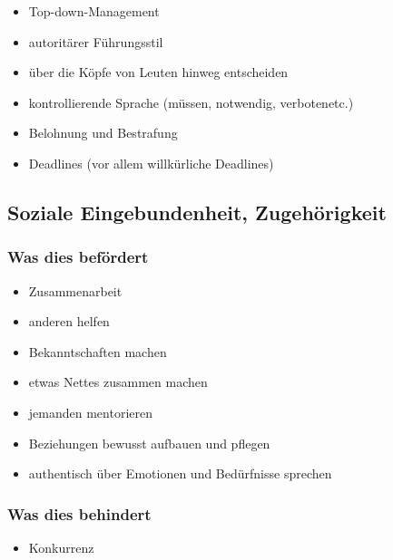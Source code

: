 \begin{itemize}
    \item Top-down-Management
    \item autoritärer Führungsstil 
    \item über die Köpfe von Leuten hinweg entscheiden
    \item kontrollierende Sprache (\glqq müssen\grqq, \glqq notwendig\grqq, \glqq verboten\grqq etc.)
    \item Belohnung und Bestrafung
    \item Deadlines (vor allem willkürliche Deadlines) 
\end{itemize}

\subsection{Soziale Eingebundenheit, Zugehörigkeit}

\subsubsection{Was dies befördert}

\begin{itemize}
    \item Zusammenarbeit
    \item anderen helfen
    \item Bekanntschaften machen
    \item etwas Nettes zusammen machen
    \item jemanden mentorieren
    \item Beziehungen bewusst aufbauen und pflegen
    \item authentisch über Emotionen und Bedürfnisse sprechen
\end{itemize}

\subsubsection{Was dies behindert}

\begin{itemize}
    \item Konkurrenz
\end{itemize}
